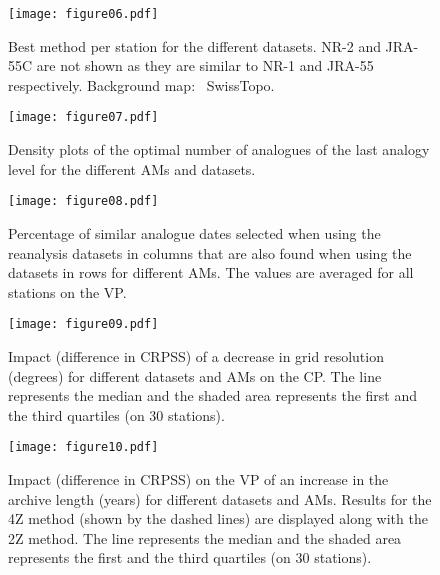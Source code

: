 \documentclass[smallextended]{svjour3}       %
\begin{document}
	\begin{figure*}
		\texttt{[image: figure06.pdf]}\\
		\caption{Best method per station for the different datasets. NR-2 and JRA-55C are not shown as they are similar to NR-1 and JRA-55 respectively. Background map: \textcopyright\ SwissTopo.}
		\label{fig:map_best_methods}
	\end{figure*}
	
	\begin{figure}
		\texttt{[image: figure07.pdf]}\\
		\caption{Density plots of the optimal number of analogues of the last analogy level for the different AMs and datasets.}
		\label{fig:number_analogues}
	\end{figure}
	
	\begin{figure}
		\texttt{[image: figure08.pdf]}\\
		\caption{Percentage of similar analogue dates selected when using the reanalysis datasets in columns that are also found when using the datasets in rows for different AMs. The values are averaged for all stations on the VP.}
		\label{fig:similarities_analogue_dates}
	\end{figure}
	
	\begin{figure}
		\texttt{[image: figure09.pdf]}\\
		\caption{Impact (difference in CRPSS) of a decrease in grid resolution (degrees) for different datasets and AMs on the CP. The line represents the median and the shaded area represents the first and the third quartiles (on 30 stations).}
		\label{fig:plot_impact_resolution}
	\end{figure}
	
	\begin{figure}
		\texttt{[image: figure10.pdf]}\\
		\caption{Impact (difference in CRPSS) on the VP of an increase in the archive length (years) for different datasets and AMs. Results for the 4Z method (shown by the dashed lines) are displayed along with the 2Z method. The line represents the median and the shaded area represents the first and the third quartiles (on 30 stations).}
		\label{fig:plot_impact_length}
	\end{figure}
	
\end{document}
